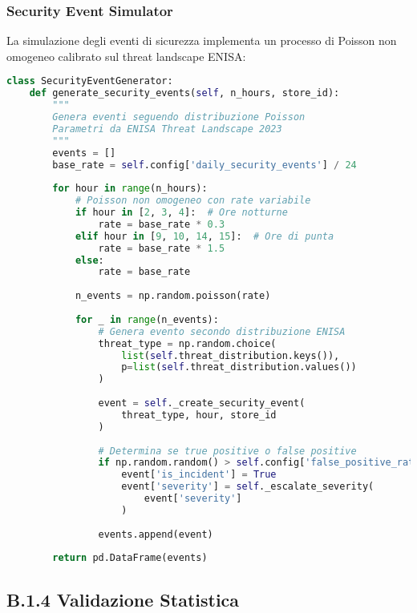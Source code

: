 \subsubsection{Security Event Simulator}

La simulazione degli eventi di sicurezza implementa un processo di Poisson non omogeneo calibrato sul threat landscape ENISA:

\begin{lstlisting}[language=Python, caption={Simulazione eventi sicurezza con distribuzione ENISA}, label={lst:security-gen}]
class SecurityEventGenerator:
    def generate_security_events(self, n_hours, store_id):
        """
        Genera eventi seguendo distribuzione Poisson
        Parametri da ENISA Threat Landscape 2023
        """
        events = []
        base_rate = self.config['daily_security_events'] / 24
        
        for hour in range(n_hours):
            # Poisson non omogeneo con rate variabile
            if hour in [2, 3, 4]:  # Ore notturne
                rate = base_rate * 0.3
            elif hour in [9, 10, 14, 15]:  # Ore di punta
                rate = base_rate * 1.5
            else:
                rate = base_rate
            
            n_events = np.random.poisson(rate)
            
            for _ in range(n_events):
                # Genera evento secondo distribuzione ENISA
                threat_type = np.random.choice(
                    list(self.threat_distribution.keys()),
                    p=list(self.threat_distribution.values())
                )
                
                event = self._create_security_event(
                    threat_type, hour, store_id
                )
                
                # Determina se true positive o false positive
                if np.random.random() > self.config['false_positive_rate']:
                    event['is_incident'] = True
                    event['severity'] = self._escalate_severity(
                        event['severity']
                    )
                    
                events.append(event)
                
        return pd.DataFrame(events)
\end{lstlisting}

\subsection{B.1.4 Validazione Statistica}

